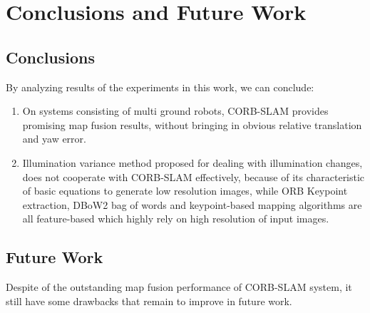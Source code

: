 
\chapter{Conclusions and Future Work}

\section{Conclusions}

By analyzing results of the experiments in this work, we can conclude:

\begin{enumerate}[1.]
	\item On systems consisting of multi ground robots, CORB-SLAM provides promising map fusion results, without bringing in obvious relative translation and yaw error.
	\item Illumination variance method proposed for dealing with illumination changes, does not cooperate with CORB-SLAM effectively, because of its characteristic of basic equations to generate low resolution images, while ORB Keypoint extraction, DBoW2 bag of words and keypoint-based mapping algorithms are all feature-based which highly rely on high resolution of input images.
\end{enumerate}

\section{Future Work}

Despite of the outstanding map fusion performance of CORB-SLAM system, it still have some drawbacks that remain to improve in future work.

